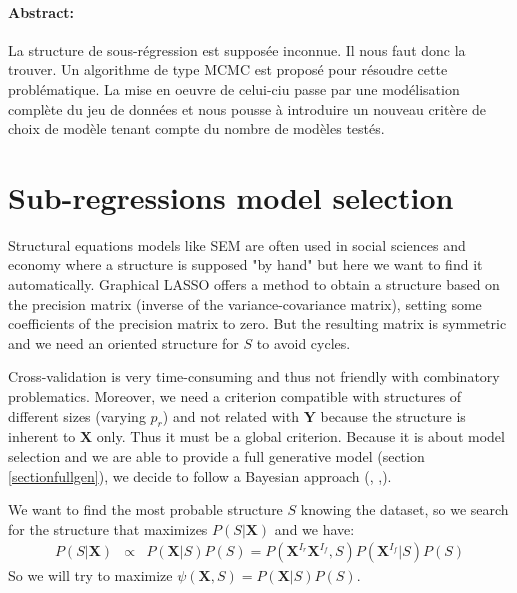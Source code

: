 \documentclass[12pt,a4paper]{report}
\begin{document}
\paragraph{Abstract:} La structure de sous-régression est supposée inconnue. Il nous faut donc la trouver. Un algorithme de type MCMC est proposé pour résoudre cette problématique. La mise en oeuvre de celui-ciu passe par une modélisation complète du jeu de données et nous pousse à introduire un nouveau critère de choix de modèle tenant compte du nombre de modèles testés.


\section{Sub-regressions model selection}	
Structural equations models like \textsc{SEM} are often used in social sciences and economy where a structure is supposed "by hand" but here we want to find it automatically. Graphical LASSO \cite{friedman2008sparse} offers a method to obtain a structure based on the precision matrix (inverse of the variance-covariance matrix), setting some coefficients of the precision matrix to zero. But the resulting matrix is symmetric and we need an oriented structure for $S$ to avoid cycles.

Cross-validation is very time-consuming and thus not friendly with combinatory problematics. Moreover, we need a criterion compatible with structures of different sizes (varying $p_r$) and not related with $\boldsymbol{Y}$ because the structure is inherent to $\boldsymbol{X}$ only. Thus it must be a global criterion. 	
Because it is about model selection and we are able to provide a full generative model (section \ref{sectionfullgen}), we decide to follow a Bayesian approach (\cite{raftery1995bayesian}, \cite{andrieu1999joint},\cite{chipman2001practical}).  
	
We want to find the most probable structure $S$ knowing the dataset, so we search for the structure that maximizes $P(S|\boldsymbol{X})$ and we have:	
	\begin{eqnarray}
	 \label{approxBIC} P(S|\boldsymbol{X})&\propto & P(\boldsymbol{X}|S)P(S)
	=P(\boldsymbol{X}^{I_r}\boldsymbol{X}^{I_f},S)P(\boldsymbol{X}^{I_f}|S)P(S)
	\end{eqnarray}
So we will try to maximize $\psi(\boldsymbol{X},S)=P(\boldsymbol{X}|S)P(S)$.
	
\end{document}
